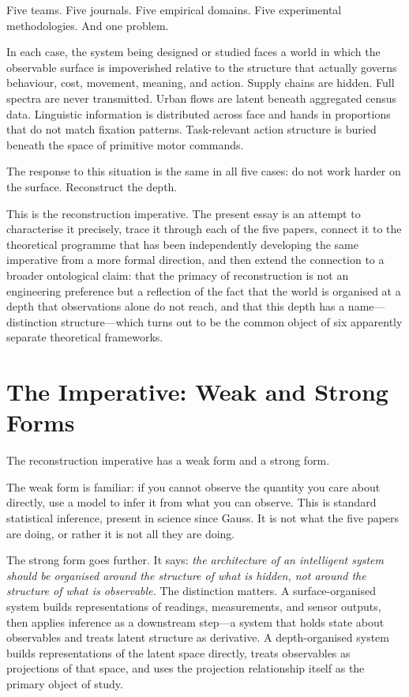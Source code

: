 \documentclass[12pt, letterpaper]{article}
\theoremstyle{remark}
\begin{document}
Five teams.  Five journals.  Five empirical domains.  Five experimental
methodologies.  And one problem.

In each case, the system being designed or studied faces a world in which
the observable surface is impoverished relative to the structure that
actually governs behaviour, cost, movement, meaning, and action.
Supply chains are hidden.  Full spectra are never transmitted.  Urban flows
are latent beneath aggregated census data.  Linguistic information is
distributed across face and hands in proportions that do not match fixation
patterns.  Task-relevant action structure is buried beneath the space of
primitive motor commands.

The response to this situation is the same in all five cases: do not work
harder on the surface.  Reconstruct the depth.

This is the reconstruction imperative.  The present essay is an attempt to
characterise it precisely, trace it through each of the five papers, connect
it to the theoretical programme that has been independently developing the
same imperative from a more formal direction, and then extend the connection
to a broader ontological claim: that the primacy of reconstruction is not
an engineering preference but a reflection of the fact that the world is
organised at a depth that observations alone do not reach, and that this
depth has a name---distinction structure---which turns out to be the common
object of six apparently separate theoretical frameworks.

\section{The Imperative: Weak and Strong Forms}

The reconstruction imperative has a weak form and a strong form.

The weak form is familiar: if you cannot observe the quantity you care about
directly, use a model to infer it from what you can observe.  This is
standard statistical inference, present in science since Gauss.  It is not
what the five papers are doing, or rather it is not all they are doing.

The strong form goes further.  It says: \emph{the architecture of an
intelligent system should be organised around the structure of what is
hidden, not around the structure of what is observable.}  The distinction
matters.  A surface-organised system builds representations of readings,
measurements, and sensor outputs, then applies inference as a downstream
step---a system that holds state about observables and treats latent
structure as derivative.  A depth-organised system builds representations
of the latent space directly, treats observables as projections of that
space, and uses the projection relationship itself as the primary object
of study.
\end{document}
